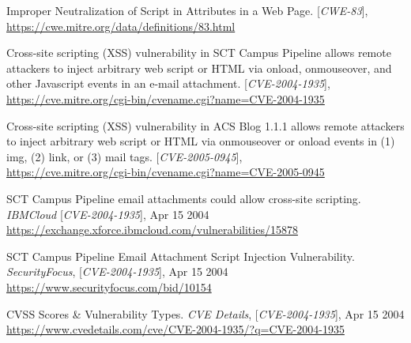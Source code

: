 \newpage
\begin{thebibliography}{9}
%
%
Improper Neutralization of Script in Attributes in a Web Page. [\textit{CWE-83}],  \\ \url{https://cwe.mitre.org/data/definitions/83.html}

Cross-site scripting (XSS) vulnerability in SCT Campus Pipeline allows remote attackers to inject arbitrary web script or HTML via onload, onmouseover, and other Javascript events in an e-mail attachment.  [\textit{CVE-2004-1935}],  \\ \url{https://cve.mitre.org/cgi-bin/cvename.cgi?name=CVE-2004-1935}

Cross-site scripting (XSS) vulnerability in ACS Blog 1.1.1 allows remote attackers to inject arbitrary web script or HTML via onmouseover or onload events in (1) img, (2) link, or (3) mail tags.  [\textit{CVE-2005-0945}],  \\ \url{https://cve.mitre.org/cgi-bin/cvename.cgi?name=CVE-2005-0945}

SCT Campus Pipeline email attachments could allow cross-site scripting.  \textit{IBMCloud} [\textit{CVE-2004-1935}], Apr 15 2004  \\ \url{https://exchange.xforce.ibmcloud.com/vulnerabilities/15878}

 SCT Campus Pipeline Email Attachment Script Injection Vulnerability. \textit{SecurityFocus}, [\textit{CVE-2004-1935}], Apr 15 2004 \\ \url{https://www.securityfocus.com/bid/10154}
 
 	CVSS Scores \& Vulnerability Types. \textit{CVE Details}, [\textit{CVE-2004-1935}], Apr 15 2004  \\ \url{https://www.cvedetails.com/cve/CVE-2004-1935/?q=CVE-2004-1935}


\end{thebibliography}
